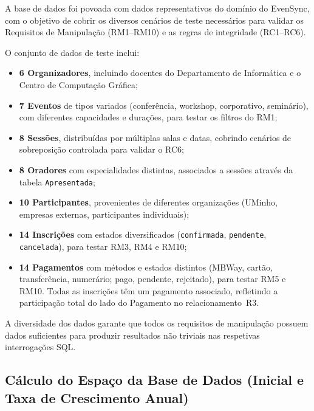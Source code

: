 \documentclass[runningheads]{llncs}
\begin{document}
                A base de dados foi povoada com dados representativos do domínio do EvenSync, com o objetivo de cobrir os diversos cenários de teste necessários para validar os Requisitos de Manipulação (RM1--RM10) e as regras de integridade (RC1--RC6).

                O conjunto de dados de teste inclui:

                \begin{itemize}
                    \item \textbf{6 Organizadores}, incluindo docentes do Departamento de Informática e o Centro de Computação Gráfica;
                    \item \textbf{7 Eventos} de tipos variados (conferência, workshop, corporativo, seminário), com diferentes capacidades e durações, para testar os filtros do RM1;
                    \item \textbf{8 Sessões}, distribuídas por múltiplas salas e datas, cobrindo cenários de sobreposição controlada para validar o RC6;
                    \item \textbf{8 Oradores} com especialidades distintas, associados a sessões através da tabela \texttt{Apresentada};
                    \item \textbf{10 Participantes}, provenientes de diferentes organizações (UMinho, empresas externas, participantes individuais);
                    \item \textbf{14 Inscrições} com estados diversificados (\texttt{confirmada}, \texttt{pendente}, \texttt{cancelada}), para testar RM3, RM4 e RM10;
                    \item \textbf{14 Pagamentos} com métodos e estados distintos (MBWay, cartão, transferência, numerário; pago, pendente, rejeitado), para testar RM5 e RM10. Todas as inscrições têm um pagamento associado, refletindo a participação total do lado do Pagamento no relacionamento~R3.
                \end{itemize}

                A diversidade dos dados garante que todos os requisitos de manipulação possuem dados suficientes para produzir resultados não triviais nas respetivas interrogações SQL.

                \subsection{Cálculo do Espaço da Base de Dados (Inicial e Taxa de Crescimento Anual)}
\end{document}
